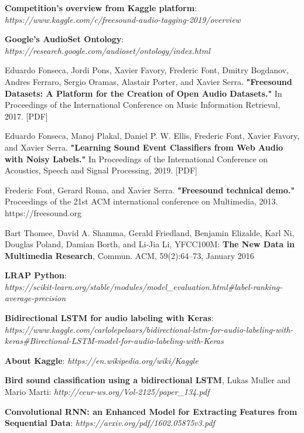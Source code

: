 \documentclass[11pt, a4papper]{report}
\theoremstyle{plain}
\theoremstyle{definition}
\theoremstyle{definition}
\theoremstyle{proposition}
\begin{document}
\begin{thebibliography}{1}
 \textbf{Competition's overview from Kaggle platform}: \\
\textit{https://www.kaggle.com/c/freesound-audio-tagging-2019/overview}

 \textbf{Google’s AudioSet Ontology}: \textit{https://research.google.com/audioset/ontology/index.html}

 Eduardo Fonseca, Jordi Pons, Xavier Favory, Frederic Font, Dmitry Bogdanov, Andres Ferraro, Sergio Oramas, Alastair Porter, and Xavier Serra. \textbf{"Freesound Datasets: A Platform for the Creation of Open Audio Datasets."} In Proceedings of the International Conference on Music Information Retrieval, 2017. [PDF]

 Eduardo Fonseca, Manoj Plakal, Daniel P. W. Ellis, Frederic Font, Xavier Favory, and Xavier Serra. \textbf{"Learning Sound Event Classifiers from Web Audio with Noisy Labels."} In Proceedings of the International Conference on Acoustics, Speech and Signal Processing, 2019. [PDF]

 Frederic Font, Gerard Roma, and Xavier Serra. \textbf{"Freesound technical demo."} Proceedings of the 21st ACM international conference on Multimedia, 2013. https://freesound.org

 Bart Thomee, David A. Shamma, Gerald Friedland, Benjamin Elizalde, Karl Ni, Douglas Poland, Damian Borth, and Li-Jia Li, YFCC100M: \textbf{The New Data in Multimedia Research}, Commun. ACM, 59(2):64–73, January 2016

 \textbf{LRAP Python}: \\
 \textit{https://scikit-learn.org/stable/modules/model\_evaluation.html\#label-ranking-average-precision}
 
 \textbf{Bidirectional LSTM for audio labeling with Keras}: \\
\textit{https://www.kaggle.com/carlolepelaars/bidirectional-lstm-for-audio-labeling-with-keras\#Birectional-LSTM-model-for-audio-labeling-with-Keras}

 \textbf{About Kaggle}: \textit{https://en.wikipedia.org/wiki/Kaggle}

 \textbf{Bird sound classification using a bidirectional LSTM}, Lukas Muller and Mario Marti: \textit{http://ceur-ws.org/Vol-2125/paper\_134.pdf}

 \textbf{Convolutional RNN: an Enhanced Model for Extracting Features from Sequential Data}: \textit{https://arxiv.org/pdf/1602.05875v3.pdf}


\end{thebibliography}
\end{document}

